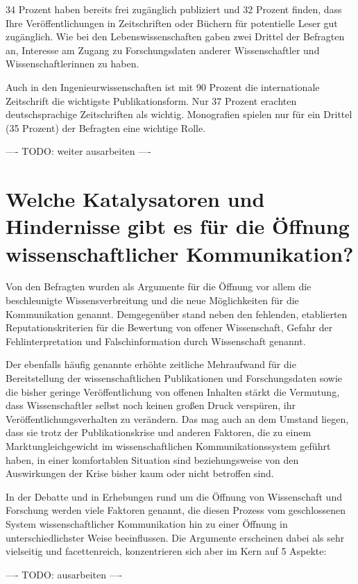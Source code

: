 34 Prozent haben bereits frei zugänglich publiziert und 32 Prozent finden, dass Ihre Veröffentlichungen in Zeitschriften oder Büchern für potentielle Leser gut zugänglich. Wie bei den Lebenswissenschaften gaben zwei Drittel der Befragten an, Interesse am Zugang zu Forschungsdaten anderer Wissenschaftler und Wissenschaftlerinnen zu haben.

Auch in den Ingenieurwissenschaften ist mit 90 Prozent die internationale Zeitschrift die wichtigste Publikationsform. Nur 37 Prozent erachten deutschsprachige Zeitschriften als wichtig. Monografien spielen nur für ein Drittel (35 Prozent) der Befragten eine wichtige Rolle.

---- TODO: weiter ausarbeiten ----

\section{Welche Katalysatoren und Hindernisse gibt es für die Öffnung wissenschaftlicher Kommunikation?}

Von den Befragten wurden als Argumente für die Öffnung vor allem die beschleunigte Wissensverbreitung und die neue Möglichkeiten für die Kommunikation genannt. Demgegenüber stand neben den fehlenden, etablierten Reputationskriterien für die Bewertung von offener Wissenschaft, Gefahr der Fehlinterpretation und Falschinformation durch Wissenschaft genannt.

Der ebenfalls häufig genannte erhöhte zeitliche Mehraufwand für die Bereitstellung der wissenschaftlichen Publikationen und Forschungsdaten sowie die bisher geringe Veröffentlichung von offenen Inhalten stärkt die Vermutung, dass Wissenschaftler selbst noch keinen großen Druck verspüren, ihr Veröffentlichungsverhalten zu verändern. Das mag auch an dem Umstand liegen, dass sie trotz der Publikationskrise und anderen Faktoren, die zu einem Marktungleichgewicht im wissenschaftlichen Kommunikationssystem geführt haben, in einer komfortablen Situation sind beziehungsweise von den Auswirkungen der Krise bisher kaum oder nicht betroffen sind.

In der Debatte und in Erhebungen rund um die Öffnung von Wissenschaft und Forschung werden viele Faktoren genannt, die diesen Prozess vom geschlossenen System wissenschaftlicher Kommunikation hin zu einer Öffnung in unterschiedlichster Weise beeinflussen. Die Argumente erscheinen dabei als sehr vielseitig und facettenreich, konzentrieren sich aber im Kern auf 5 Aspekte:

---- TODO: ausarbeiten ----

